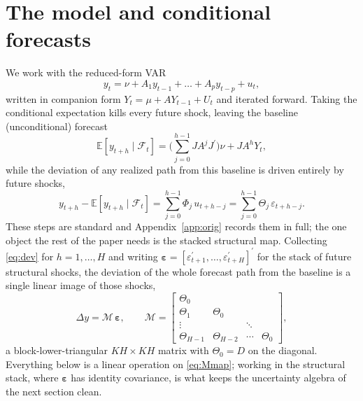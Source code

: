 \documentclass[11pt]{article}
\newcommand{\E}{\mathbb{E}}
\newcommand{\Fset}{\mathcal{F}}
\newcommand{\tp}{^{\prime}}
\newcommand{\eps}{\varepsilon}
\newcommand{\beps}{\bm{\varepsilon}}
\newcommand{\Mmap}{\mathcal{M}}
\theoremstyle{remark}
\begin{document}
\section{The model and conditional forecasts}\label{sec:model}
We work with the reduced-form VAR
\begin{equation}
y_t=\nu+A_1y_{t-1}+\dots+A_py_{t-p}+u_t,
\label{eq:var}
\end{equation}
written in companion form $Y_t=\mu+AY_{t-1}+U_t$ and iterated forward. Taking the
conditional expectation kills every future shock, leaving the baseline
(unconditional) forecast
\begin{equation}
\E[y_{t+h}\mid\Fset_t]=\Big(\textstyle\sum_{j=0}^{h-1}JA^{j}J\tp\Big)\nu+JA^{h}Y_t,
\label{eq:baseline}
\end{equation}
while the deviation of any realized path from this baseline is driven entirely by
future shocks,
\begin{equation}
y_{t+h}-\E[y_{t+h}\mid\Fset_t]=\sum_{j=0}^{h-1}\Phi_j\,u_{t+h-j}
=\sum_{j=0}^{h-1}\Theta_j\,\eps_{t+h-j}.
\label{eq:dev}
\end{equation}
These steps are standard and Appendix~\ref{app:orig} records them in full; the one
object the rest of the paper needs is the stacked structural map. Collecting
\eqref{eq:dev} for $h=1,\dots,H$ and writing
$\beps=[\eps_{t+1}\tp,\dots,\eps_{t+H}\tp]\tp$ for the stack of future structural
shocks, the deviation of the whole forecast path from the baseline is a single
linear image of those shocks,
\begin{equation}
\Delta y=\Mmap\,\beps,
\qquad
\Mmap=\begin{bmatrix}
\Theta_0 & & & \\
\Theta_1 & \Theta_0 & & \\
\vdots & & \ddots & \\
\Theta_{H-1} & \Theta_{H-2} & \cdots & \Theta_0
\end{bmatrix},
\label{eq:Mmap}
\end{equation}
a block-lower-triangular $KH\times KH$ matrix with $\Theta_0=D$ on the diagonal.
Everything below is a linear operation on \eqref{eq:Mmap}; working in the
structural stack, where $\beps$ has identity covariance, is what keeps the
uncertainty algebra of the next section clean.
\end{document}
